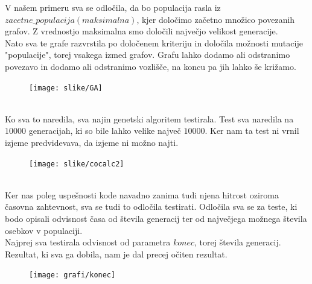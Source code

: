 \documentclass[12pt,a4paper]{amsart}
\theoremstyle{definition} %
\theoremstyle{plain} %
\begin{document}
V našem primeru sva se odločila, da bo populacija rasla iz $zacetne\_populacija(maksimalna)$, kjer določimo začetno množico povezanih grafov. Z vrednostjo maksimalna smo določili največjo velikost generacije.\\
Nato sva te grafe razvrstila po določenem kriteriju in določila možnosti mutacije "populacije", torej vsakega izmed grafov. Grafu lahko dodamo ali odstranimo povezavo in dodamo ali odstranimo vozlišče, na koncu pa jih lahko še križamo.\\
\begin{figure}[h]
	\texttt{[image: slike/GA]}
\end{figure}
\ \\

Ko sva to naredila, sva najin genetski algoritem testirala.
Test sva naredila na $10000$ generacijah, ki so bile lahko velike največ $10000$. Ker nam ta test ni vrnil izjeme predvidevava, da izjeme ni možno najti.\\
\begin{figure}[h]
	\texttt{[image: slike/cocalc2]}
\end{figure}

\ \\
Ker nas poleg uspešnosti kode navadno zanima tudi njena hitrost oziroma časovna zahtevnost, sva se tudi to odločila testirati. Odločila sva se za teste, ki bodo opisali odvisnost časa od števila generacij ter od največjega možnega števila osebkov v populaciji.\\
Najprej sva testirala odvisnost od parametra $konec$, torej števila generacij. Rezultat, ki sva ga dobila, nam je dal precej očiten rezultat.
\begin{figure}[h]
	\texttt{[image: grafi/konec]}
\end{figure}
\ \\
\end{document}
